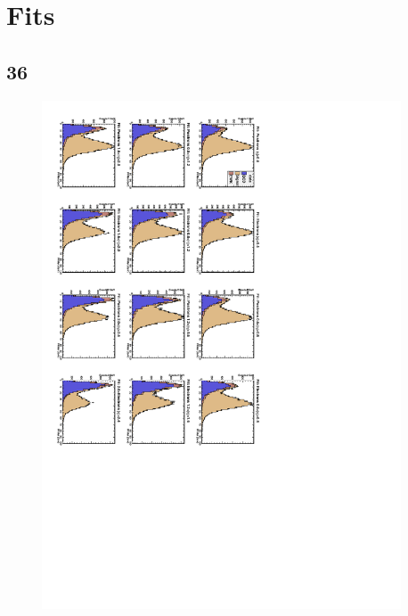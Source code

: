 \chapter{Fits}

\section{\unit{36}{\invpb}}

\begin{figure}
\begin{center}
\includegraphics[trim = 80mm 100mm 0mm 0mm, clip, angle=90, width=0.95\textwidth]{Dec22_data}

\end{center}
\end{figure}
